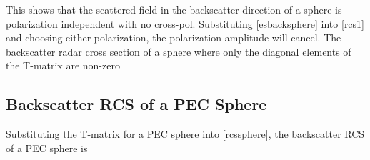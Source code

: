 This shows that the scattered field in the backscatter direction of a sphere is polarization independent with no cross-pol. Substituting \eqref{esbacksphere} into \eqref{rcs1} and choosing either polarization, the polarization amplitude will cancel. The backscatter radar cross section of a sphere where only the diagonal elements of the T-matrix are non-zero

\subsection{Backscatter RCS of a PEC Sphere}

Substituting the T-matrix for a PEC sphere into \eqref{rcssphere}, the backscatter RCS of a PEC sphere is


%
%
%
%
%
%
%
%
%
%
%
%
%
%


